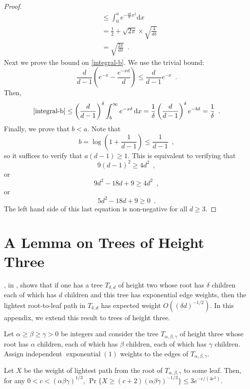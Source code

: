 \documentclass{patmorin}
\DeclareMathOperator{\exponential}{exponential}
\begin{document}
\begin{proof}
\begin{align*}
        & \le \int_0^a e^{-\frac{d\delta}{8}x^2} \mathrm{d}x \\
        & = \frac{1}{2}+\sqrt{2\pi}\times\sqrt{\frac{4}{d\delta}} \\
        & = \sqrt{\frac{2\pi}{d\delta}} \enspace .
   \end{align*}
   Next we prove the bound on \eqref{integral-b}.  We use the trivial bound:
   \[
       \frac{d}{d-1}\left(e^{-x}-\frac{e^{-xd}}{d}\right) 
         \le \frac{d}{d-1}e^{-x}
       \enspace .
   \]
   Then,
   \[
      \eqref{integral-b} \le \left(\frac{d}{d-1}\right)^\delta
       \int_b^\infty e^{-x\delta} \,\mathrm{d}x 
       = \frac{1}{\delta}\left(\frac{d}{d-1}\right)^\delta e^{-b\delta}
       = \frac{1}{\delta} \enspace .
   \]
   Finally, we prove that $b<a$.  Note that 
   \[  b=\log\left(1+\frac{1}{d-1}\right)  \le \frac{1}{d-1} \enspace , \]
   so it suffices to verify that $a(d-1)\ge 1$.  This is equivalent to verifying
   that
   \[ 9(d-1)^2 \ge 4d^2 \enspace , \]
   or
   \[ 9d^2 - 18d + 9 \ge 4d^2 \enspace , \]
   or
   \[ 5d^2 - 18d + 9 \ge 0 \enspace . \]
   The left hand side of this last equation is non-negative for all $d\ge 3$.
\end{proof}

\section{A Lemma on Trees of Height Three}

, in , shows that if one has a tree
$T_{\delta,d}$ of height two whose root has $\delta$ children each of
which has $d$ children and this tree has exponential edge weights, then
the lightest root-to-leaf path in $T_{\delta,d}$ has expected weight
$O((\delta d)^{-1/2})$.  In this appendix, we extend this result to
trees of height three.

Let $\alpha \ge \beta \ge \gamma > 0$ be integers and consider the
tree $T_{\alpha,\beta,\gamma}$ of height three whose root has $\alpha$
children, each of which has $\beta$ children, each of which has $\gamma$
children.  Assign independent $\exponential(1)$ weights to the edges
of $T_{\alpha,\beta,\gamma}$.

\begin{lem}
   Let $X$ be the weight of lightest path from the root of
   $T_{\alpha,\beta,\gamma}$ to some leaf.  Then, 
   for any $0<c<(\alpha\beta\gamma)^{1/3}$,  $\Pr\{X
   \ge (c+2)(\alpha\beta\gamma)^{-1/3} \} \le 3e^{-c/(4e^2)}$.
\end{lem}
\end{document}
